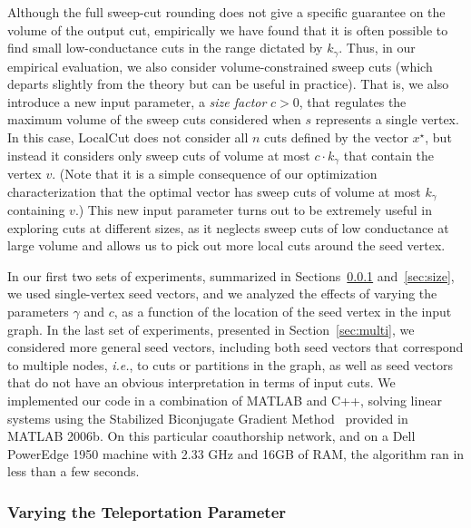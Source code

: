\documentclass[11pt]{article}
\begin{document}
Although the full sweep-cut rounding does not give a specific guarantee on 
the volume of the output cut, empirically we have found that it is often 
possible to find small low-conductance cuts in the range dictated by $k_\gamma$.
Thus, in our empirical evaluation, we also consider volume-constrained sweep 
cuts (which departs slightly from the theory but can be useful in practice).
That is, we also introduce a new input 
parameter, a \textit{size factor} $c > 0$, that regulates the maximum volume 
of the sweep cuts considered when $s$ represents a single vertex.
In this case, \textsf{LocalCut} does not consider all $n$ cuts defined by 
the vector $x^{\star}$, but instead it considers only sweep cuts of volume 
at most $c\cdot k_\gamma$ that contain the vertex $v$.
(Note that it is a simple consequence of our optimization characterization 
that the optimal vector has sweep cuts of volume at most $k_\gamma$ 
containing $v$.)
This new input parameter turns out to be extremely useful in exploring cuts 
at different sizes, as it neglects sweep cuts of low conductance at large 
volume and allows us to pick out more local cuts around the seed vertex.

In our first two sets of experiments, summarized in 
Sections~\ref{sec:teleport} and~\ref{sec:size}, we used single-vertex seed 
vectors, and we analyzed the effects of varying the parameters $\gamma$ and 
$c$, as a function of the location of the seed vertex in the input graph.
In the last set of experiments, presented in Section~\ref{sec:multi}, we 
considered more general seed vectors, including both seed vectors that 
correspond to multiple nodes, \emph{i.e.}, to cuts or partitions in the 
graph, as well as seed vectors that do not have an obvious interpretation in 
terms of input cuts.
We implemented our code in a combination of MATLAB and C++, solving linear 
systems using the Stabilized Biconjugate Gradient Method~\cite{bicg92} 
provided in MATLAB 2006b. 
On this particular coauthorship network, and on a Dell PowerEdge 1950 
machine with 2.33 GHz and 16GB of RAM, the algorithm ran in less than a few 
seconds.



\subsubsection{Varying the Teleportation Parameter}
\label{sec:teleport}
\end{document}
